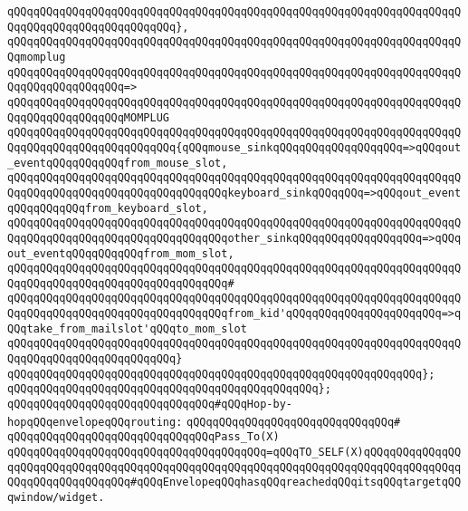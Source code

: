 \verb|qQQqqQQqqQQqqQQqqQQqqQQqqQQqqQQqqQQqqQQqqQQqqQQqqQQqqQQqqQQqqQQqqQQqqQQqqQQqqQQqqQQqqQQqqQQqqQQq},|\newline
\newline
\verb|qQQqqQQqqQQqqQQqqQQqqQQqqQQqqQQqqQQqqQQqqQQqqQQqqQQqqQQqqQQqqQQqqQQqqQQqmomplug|\newline
\verb|qQQqqQQqqQQqqQQqqQQqqQQqqQQqqQQqqQQqqQQqqQQqqQQqqQQqqQQqqQQqqQQqqQQqqQQqqQQqqQQqqQQqqQQq=>|\newline
\verb|qQQqqQQqqQQqqQQqqQQqqQQqqQQqqQQqqQQqqQQqqQQqqQQqqQQqqQQqqQQqqQQqqQQqqQQqqQQqqQQqqQQqqQQqMOMPLUG|\newline
\verb|qQQqqQQqqQQqqQQqqQQqqQQqqQQqqQQqqQQqqQQqqQQqqQQqqQQqqQQqqQQqqQQqqQQqqQQqqQQqqQQqqQQqqQQqqQQqqQQq{qQQqmouse_sinkqQQqqQQqqQQqqQQqqQQq=>qQQqout_eventqQQqqQQqqQQqfrom_mouse_slot,|\newline
\verb|qQQqqQQqqQQqqQQqqQQqqQQqqQQqqQQqqQQqqQQqqQQqqQQqqQQqqQQqqQQqqQQqqQQqqQQqqQQqqQQqqQQqqQQqqQQqqQQqqQQqqQQqkeyboard_sinkqQQqqQQq=>qQQqout_eventqQQqqQQqqQQqfrom_keyboard_slot,|\newline
\verb|qQQqqQQqqQQqqQQqqQQqqQQqqQQqqQQqqQQqqQQqqQQqqQQqqQQqqQQqqQQqqQQqqQQqqQQqqQQqqQQqqQQqqQQqqQQqqQQqqQQqqQQqother_sinkqQQqqQQqqQQqqQQqqQQq=>qQQqout_eventqQQqqQQqqQQqfrom_mom_slot,|\newline
\verb|qQQqqQQqqQQqqQQqqQQqqQQqqQQqqQQqqQQqqQQqqQQqqQQqqQQqqQQqqQQqqQQqqQQqqQQqqQQqqQQqqQQqqQQqqQQqqQQqqQQqqQQq#|\newline
\verb|qQQqqQQqqQQqqQQqqQQqqQQqqQQqqQQqqQQqqQQqqQQqqQQqqQQqqQQqqQQqqQQqqQQqqQQqqQQqqQQqqQQqqQQqqQQqqQQqqQQqqQQqfrom_kid'qQQqqQQqqQQqqQQqqQQqqQQq=>qQQqtake_from_mailslot'qQQqto_mom_slot|\newline
\verb|qQQqqQQqqQQqqQQqqQQqqQQqqQQqqQQqqQQqqQQqqQQqqQQqqQQqqQQqqQQqqQQqqQQqqQQqqQQqqQQqqQQqqQQqqQQqqQQq}|\newline
\verb|qQQqqQQqqQQqqQQqqQQqqQQqqQQqqQQqqQQqqQQqqQQqqQQqqQQqqQQqqQQqqQQq};|\newline
\verb|qQQqqQQqqQQqqQQqqQQqqQQqqQQqqQQqqQQqqQQqqQQqqQQq};|\newline
\newline
\verb|qQQqqQQqqQQqqQQqqQQqqQQqqQQqqQQq#qQQqHop-by-hopqQQqenvelopeqQQqrouting:|\newline
\verb|qQQqqQQqqQQqqQQqqQQqqQQqqQQqqQQq#|\newline
\verb|qQQqqQQqqQQqqQQqqQQqqQQqqQQqqQQqPass_To(X)|\newline
\verb|qQQqqQQqqQQqqQQqqQQqqQQqqQQqqQQqqQQqqQQq=qQQqTO_SELF(X)qQQqqQQqqQQqqQQqqQQqqQQqqQQqqQQqqQQqqQQqqQQqqQQqqQQqqQQqqQQqqQQqqQQqqQQqqQQqqQQqqQQqqQQqqQQqqQQqqQQqqQQq#qQQqEnvelopeqQQqhasqQQqreachedqQQqitsqQQqtargetqQQqwindow/widget.|\newline
